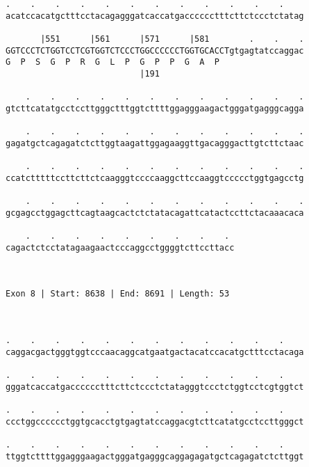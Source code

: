 \documentclass{article}
\begin{document}
\begin{Verbatim}
.    .    .    .    .    .    .    .    .    .    .    .    
acatccacatgctttcctacagagggatcaccatgacccccctttcttctccctctatag
                                                            
       |551      |561      |571      |581        .    .    .
GGTCCCTCTGGTCCTCGTGGTCTCCCTGGCCCCCCTGGTGCACCTgtgagtatccaggac
G  P  S  G  P  R  G  L  P  G  P  P  G  A  P                 
                           |191                             
  
    .    .    .    .    .    .    .    .    .    .    .    .
gtcttcatatgcctccttgggctttggtcttttggagggaagactgggatgagggcagga
                                                            
    .    .    .    .    .    .    .    .    .    .    .    .
gagatgctcagagatctcttggtaagattggagaaggttgacagggacttgtcttctaac
                                                            
    .    .    .    .    .    .    .    .    .    .    .    .
ccatctttttccttcttctcaagggtccccaaggcttccaaggtccccctggtgagcctg
                                                            
    .    .    .    .    .    .    .    .    .    .    .    .
gcgagcctggagcttcagtaagcactctctatacagattcatactccttctacaaacaca
                                                            
    .    .    .    .    .    .    .    .    . 
cagactctcctatagaagaactcccaggcctggggtcttccttacc
                                              
                                              
 
Exon 8 | Start: 8638 | End: 8691 | Length: 53



.    .    .    .    .    .    .    .    .    .    .    .    
caggacgactgggtggtcccaacaggcatgaatgactacatccacatgctttcctacaga
                                                            
.    .    .    .    .    .    .    .    .    .    .    .    
gggatcaccatgacccccctttcttctccctctatagggtccctctggtcctcgtggtct
                                                            
.    .    .    .    .    .    .    .    .    .    .    .    
ccctggcccccctggtgcacctgtgagtatccaggacgtcttcatatgcctccttgggct
                                                            
.    .    .    .    .    .    .    .    .    .    .    .    
ttggtcttttggagggaagactgggatgagggcaggagagatgctcagagatctcttggt
                                                            

\end{Verbatim}
\end{document}
